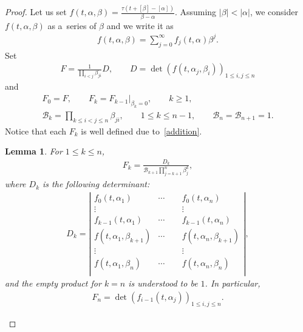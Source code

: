 \documentclass[pdftex]{sigma}
\numberwithin{equation}{section}
\newtheorem{Lemma}[Theorem]{Lemma}
\theoremstyle{definition}
\begin{document}
\begin{proof}
Let us set
$
f(t,\alpha,\beta)=\frac{\tau(t+[\beta]-[\alpha])}{\beta-\alpha}$.
Assuming $|\beta|<|\alpha|$, we consider $f(t,\alpha,\beta)$ as a~series of $\beta$ and
we write it as
\begin{gather}
f(t,\alpha,\beta)=\sum_{j=0}^\infty f_j(t,\alpha)\beta^j.
\label{f-expansion}
\end{gather}
Set
\begin{gather}
F=\frac{1}{\prod_{i<j}\beta_{ji}}D,
\qquad
 D=\det\left(f(t,\alpha_j,\beta_i)\right)_{1\leq i,j\leq n}
\label{def-F}
\end{gather}
and
\begin{gather}
F_0=F, \qquad F_{k}=F_{k-1}|_{\beta_{k}=0}, \qquad k\geq 1,\nonumber
\\
{\mathcal B}_k=\prod_{k\leq i<j\leq n}\beta_{ji}, \qquad 1\leq k\leq n-1,
\qquad
{\mathcal B}_n={\mathcal B}_{n+1}=1.\label{def-Fk}
\end{gather}
Notice that each $F_k$ is well defined due to~\eqref{addition}.

\begin{Lemma}
For $1\leq k\leq n$,
\begin{gather}
F_k=\frac{D_k}{{\mathcal B}_{k+1}\prod_{j=k+1}^n\beta_j^k},\label{Fk}
\end{gather}
where $D_k$ is the following determinant:
\begin{gather*}
D_k=
\left|
\begin{matrix}
f_0(t,\alpha_1)&\cdots&f_0(t,\alpha_n)\\
\vdots&\qquad&\vdots\\
f_{k-1}(t,\alpha_1)&\cdots&f_{k-1}(t,\alpha_n)\\
f(t,\alpha_1,\beta_{k+1})&\cdots&f(t,\alpha_n,\beta_{k+1})\\
\vdots&\qquad&\vdots\\
f(t,\alpha_1,\beta_{n})&\cdots&f(t,\alpha_n,\beta_{n})\\
\end{matrix}
\right|,
\end{gather*}
and the empty product  for $k=n$ is understood
to be $1$.
In particular, \begin{gather}
F_n=\det\left(f_{i-1}(t,\alpha_j)\right)_{1\leq i,j\leq n}.
\label{det-expression-1}
\end{gather}
\end{Lemma}



\end{proof}
\end{document}
